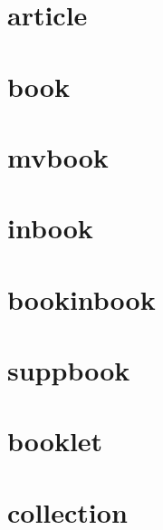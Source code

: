 \documentclass[a4paper]{article}
\begin{document}
\section{article}

\cite[1]{article}

\cite[1]{article}

\section{book}

\cite[1]{book}

\cite[1]{book}

\section{mvbook}

\cite[1]{mvbook}

\cite[1]{mvbook}

\section{inbook}

\cite[1]{inbook}

\cite[1]{inbook}

\section{bookinbook}

\cite[1]{bookinbook}

\cite[1]{bookinbook}

\section{suppbook}

\cite[1]{suppbook}

\cite[1]{suppbook}

\section{booklet}

\cite[1]{booklet}

\cite[1]{booklet}

\section{collection}

\cite[1]{collection}
\end{document}
